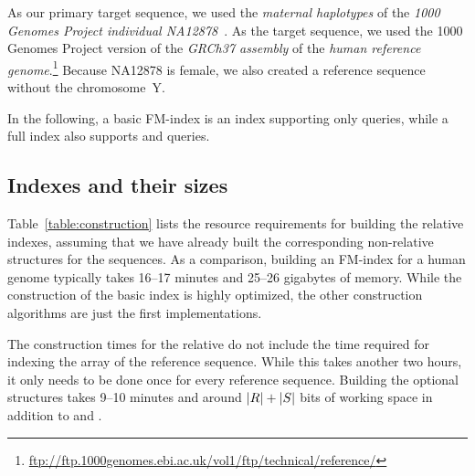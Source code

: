 As our primary target sequence, we used the \emph{maternal haplotypes} of the
\emph{1000 Genomes Project individual NA12878}~\cite{Rozowsky2011}. As the
target sequence, we used the 1000 Genomes Project version of the \emph{GRCh37
assembly} of the \emph{human reference
genome}.\footnote{\url{ftp://ftp.1000genomes.ebi.ac.uk/vol1/ftp/technical/reference/}}
Because NA12878 is female, we also created a reference sequence without the
chromosome~Y.

In the following, a basic FM-index is an index supporting only \find{}
queries, while a full index also supports \locate{} and \extract{} queries.

\subsection{Indexes and their sizes}

Table~\ref{table:construction} lists the resource requirements for building
the relative indexes, assuming that we have already built the corresponding
non-relative structures for the sequences. As a comparison, building an
FM-index for a human genome typically takes 16--17 minutes and 25--26
gigabytes of memory. While the construction of the basic \RFM{} index is
highly optimized, the other construction algorithms are just the first
implementations.

The construction times for the relative \CST{} do not include the time
required for indexing the \DLCP{} array of the reference sequence. While this
takes another two hours, it only needs to be done once for every reference
sequence. Building the optional \rselect{} structures takes 9--10 minutes and
around $\lvert R \rvert + \lvert S \rvert$ bits of working space in addition to \RFM{} and
\rselect.

